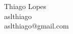 \documentclass[10pt]{article}
\makeatletter
\def\name{Thiago Lopes}
\def\username{aslthiago}
\def\email{\username @gmail.com}
\makeatother
\begin{document}
  \noindent
  \name \\
  \username \\
  \email
\end{document}
